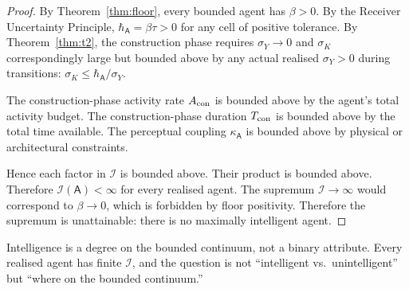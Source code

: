 \documentclass[11pt,twocolumn,a4paper]{article}
\newcommand{\agent}{\mathsf{A}}
\newcommand{\hbarA}{\hbar_{\agent}}
\newcommand{\Iindex}{\mathcal{I}}
\newcommand{\Acon}{A_{\rm con}}
\newcommand{\Tcon}{T_{\rm con}}
\begin{document}
\begin{proof}
By Theorem~\ref{thm:floor}, every bounded agent has $\beta > 0$. By the Receiver
Uncertainty Principle, $\hbarA = \beta \tau > 0$ for any cell of positive tolerance.
By Theorem~\ref{thm:t2}, the construction phase requires $\sigma_Y \to 0$ and
$\sigma_K$ correspondingly large but bounded above by any actual realised $\sigma_Y > 0$
during transitions: $\sigma_K \le \hbarA / \sigma_Y$.

The construction-phase activity rate $\Acon$ is bounded above by the agent's total
activity budget. The construction-phase duration $\Tcon$ is bounded above by the total
time available. The perceptual coupling $\kappa_\agent$ is bounded above by physical or
architectural constraints.

Hence each factor in $\Iindex$ is bounded above. Their product is bounded above.
Therefore $\Iindex(\agent) < \infty$ for every realised agent. The supremum
$\Iindex \to \infty$ would correspond to $\beta \to 0$, which is forbidden by floor
positivity. Therefore the supremum is unattainable: there is no maximally intelligent
agent.
\end{proof}

\begin{corollary}\label{cor:degree}
Intelligence is a degree on the bounded continuum, not a binary attribute. Every realised
agent has finite $\Iindex$, and the question is not ``intelligent vs.\ unintelligent'' but
``where on the bounded continuum.''
\end{corollary}
\end{document}
